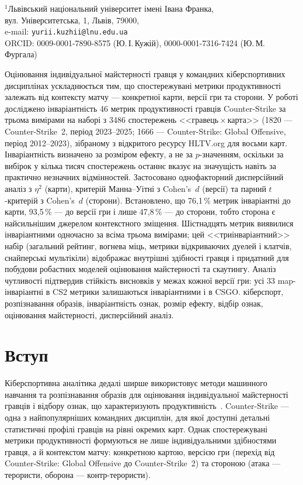 \begin{Organization}
$^{1}$Львівський національний університет імені Івана Франка,\\
вул. Університетська, 1, Львів, 79000,\\
e-mail: \texttt{yurii.kuzhii@lnu.edu.ua}\\
ORCID: 0009-0001-7890-8575 (Ю.\,І.\,Кужій), 0000-0001-7316-7424 (Ю.\,М.\,Фургала)
\end{Organization}

\begin{Abstract}
Оцінювання індивідуальної майстерності гравця у командних кіберспортивних дисциплінах
ускладнюється тим, що спостережувані метрики продуктивності залежать від контексту матчу ---
конкретної карти, версії гри та сторони. У роботі досліджено інваріантність 46 метрик
продуктивності гравців Counter-Strike за трьома вимірами на наборі з 3486 спостережень
<<гравець\,$\times$\,карта>> (1820 --- Counter-Strike~2, період 2023--2025; 1666 ---
Counter-Strike: Global Offensive, період 2012--2023), зібраному з відкритого ресурсу HLTV.org
для восьми карт. Інваріантність визначено за розміром ефекту, а не за $p$-значенням, оскільки
за вибірок у кілька тисяч спостережень останнє вказує на значущість навіть за практично
незначних відмінностей. Застосовано однофакторний дисперсійний аналіз з $\eta^2$ (карти),
критерій Манна--Уітні з Cohen's~$d$ (версії) та парний $t$-критерій з Cohen's~$d$ (сторони).
Встановлено, що 76,1\,\% метрик інваріантні до карти, 93,5\,\% --- до версії гри і лише
47,8\,\% --- до сторони, тобто сторона є найсильнішим джерелом контекстного зміщення.
Шістнадцять метрик виявилися інваріантними одночасно за всіма трьома вимірами; цей
<<триінваріантний>> набір (загальний рейтинг, вогнева міць, метрики відкриваючих дуелей і
клатчів, снайперські мультікіли) відображає внутрішні здібності гравця і придатний для побудови
робастних моделей оцінювання майстерності та скаутингу. Аналіз чутливості підтвердив стійкість
висновків у межах кожної версії гри: усі 33 map-інваріантні в CS2 метрики залишаються
інваріантними і в CSGO.
\KeywordsUkr
кіберспорт, розпізнавання образів, інваріантність ознак, розмір ефекту, відбір ознак,
оцінювання майстерності, дисперсійний аналіз.
\end{Abstract}

\section{Вступ}

Кіберспортивна аналітика дедалі ширше використовує методи машинного навчання та розпізнавання
образів для оцінювання індивідуальної майстерності гравців і відбору ознак, що характеризують
продуктивність~\cite{Bishop}. Counter-Strike --- одна з найпопулярніших командних дисциплін, для
якої доступні детальні статистичні профілі гравців на рівні окремих карт. Однак спостережувані
метрики продуктивності формуються не лише індивідуальними здібностями гравця, а й контекстом
матчу: конкретною картою, версією гри (перехід від Counter-Strike: Global Offensive до
Counter-Strike~2) та стороною (атака --- терористи, оборона --- контр-терористи).

